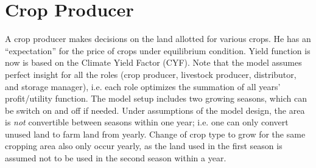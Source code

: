 \documentclass[one column,a4paper]{article}
\title{\mytitle}
\date{}
\author{}
\theoremstyle{definition}
\numberwithin{equation}			{section}
\begin{document}
\maketitle
\section{Crop Producer} %
A crop producer makes decisions on the land allotted for various crops. He has an ``expectation'' for the price of crops under equilibrium condition. Yield function is now is based on the Climate Yield Factor (CYF). Note that the model assumes perfect insight for all the roles (crop producer, livestock producer, distributor, and storage manager), i.e. each role optimizes the summation of all years' profit/utility function. The model setup includes two growing seasons, which can be switch on and off if needed. Under assumptions of the model design, the area is \textit{not} convertible between seasons within one year; i.e. one can only convert unused land to farm land from yearly. Change of crop type to grow for the same cropping area also only occur yearly, as the land used in the first season is assumed not to be used in the second season within a year.   
\end{document}

